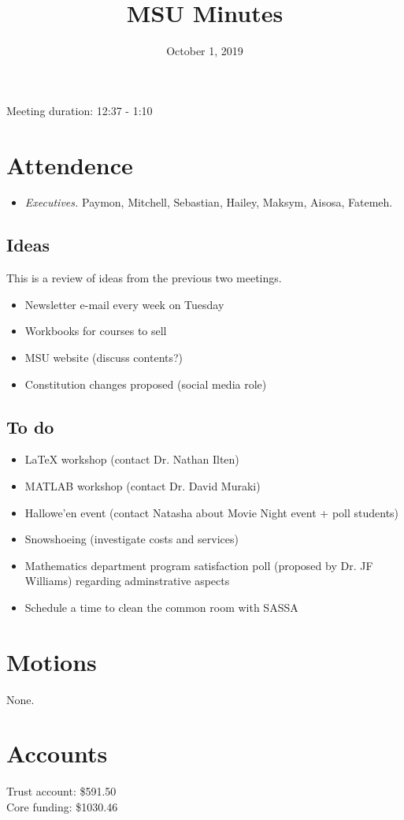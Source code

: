 \documentclass[12pt]{article}
\title{MSU Minutes}
\date{October 1, 2019}
\begin{document}
\maketitle

Meeting duration: 12:37 - 1:10

\section*{Attendence}
\begin{itemize}
\item \textit{Executives.} Paymon, Mitchell, Sebastian, Hailey, Maksym, Aisosa, Fatemeh.
\end{itemize}

\subsection*{Ideas}
This is a review of ideas from the previous two meetings.
\begin{itemize}
\item Newsletter e-mail every week on Tuesday 
\item Workbooks for courses to sell
\item MSU website (discuss contents?)
\item Constitution changes proposed (social media role)
\end{itemize}

\subsection*{To do}
\begin{itemize}
\item LaTeX workshop (contact Dr. Nathan Ilten)
\item MATLAB workshop (contact Dr. David Muraki)
\item Hallowe'en event (contact Natasha about Movie Night event + poll students)
\item Snowshoeing (investigate costs and services)
\item Mathematics department program satisfaction poll (proposed by Dr. JF Williams) regarding adminstrative aspects
\item Schedule a time to clean the common room with SASSA
\end{itemize}

\section*{Motions}
None.

\section*{Accounts}

Trust account: \$591.50 \\
Core funding: \$1030.46 \\
\end{document}
